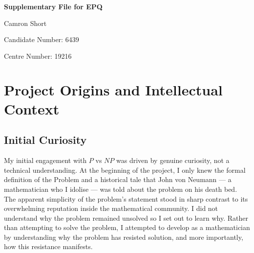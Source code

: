 \documentclass[12pt]{article}
\begin{document}
\begin{titlepage}
    \centering
    \vspace*{1cm}
    
    \Huge
    \textbf{Supplementary File for EPQ}
    
    \vspace{0.5cm}
    
    \vspace{1.5cm}
    {\Large Camron Short\par}
    {\large Candidate Number: 6439\par}
    {\large Centre Number: 19216\par}
    \vfill
\end{titlepage}

\section{Project Origins and Intellectual Context}

\subsection{Initial Curiosity}

My initial engagement with $P$ vs $NP$ was driven by genuine curiosity, not a technical understanding.
At the beginning of the project, I only knew the formal definition of the Problem and a historical tale that John von Neumann --- a mathematician who I idolise --- was told about the problem on his death bed.
The apparent simplicity of the problem's statement stood in sharp contrast to its overwhelming reputation inside the mathematical community.
I did not understand why the problem remained unsolved so I set out to learn why.
Rather than attempting to solve the problem, I attempted to develop as a mathematician by understanding why the problem has resisted solution, and more importantly, how this resistance manifests.
\end{document}
